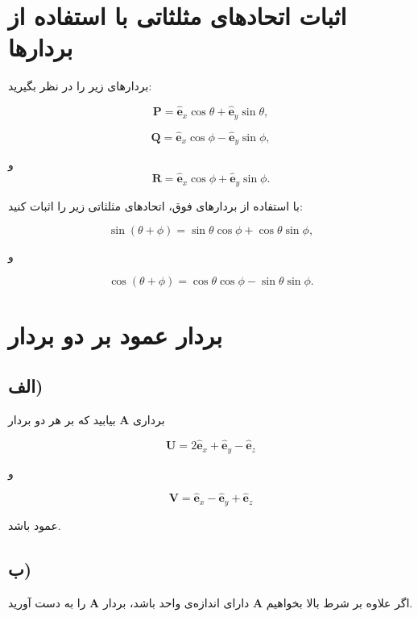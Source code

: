 \documentclass[a4paper,16pt]{article}
\begin{document}

\section{اثبات اتحادهای مثلثاتی با استفاده از بردارها}

بردارهای زیر را در نظر بگیرید:

\[
\mathbf{P}
=
\hat{\mathbf e}_x\cos\theta
+
\hat{\mathbf e}_y\sin\theta,
\]

\[
\mathbf{Q}
=
\hat{\mathbf e}_x\cos\phi
-
\hat{\mathbf e}_y\sin\phi,
\]

و
\[
\mathbf{R}
=
\hat{\mathbf e}_x\cos\phi
+
\hat{\mathbf e}_y\sin\phi.
\]

با استفاده از بردارهای فوق، اتحادهای مثلثاتی زیر را اثبات کنید:

\[
\sin(\theta+\phi)
=
\sin\theta\cos\phi
+
\cos\theta\sin\phi,
\]

و

\[
\cos(\theta+\phi)
=
\cos\theta\cos\phi
-
\sin\theta\sin\phi.
\]



\section{بردار عمود بر دو بردار}

\subsection*{الف)}

برداری $\mathbf{A}$ بیابید که بر هر دو بردار

\[
\mathbf{U}
=
2\hat{\mathbf e}_x
+
\hat{\mathbf e}_y
-
\hat{\mathbf e}_z
\]

و

\[
\mathbf{V}
=
\hat{\mathbf e}_x
-
\hat{\mathbf e}_y
+
\hat{\mathbf e}_z
\]

عمود باشد.

\subsection*{ب)}

اگر علاوه بر شرط بالا بخواهیم $\mathbf{A}$ دارای اندازه‌ی واحد باشد، بردار $\mathbf{A}$ را به دست آورید.


\end{document}
